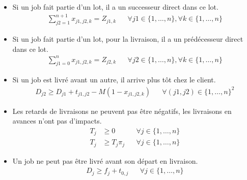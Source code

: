 \begin{itemize}
	\item
	      Si un job fait partie d’un lot, il a un successeur direct dans ce lot.
	      \begin{align}
		      \sum_{j2=1}^{n+1} x_{j1,j2,k} = Z_{j1,k} &  &
		      \forall j1 \in\{ 1, \ldots, n\}, \forall k \in\{1, \ldots, n\}
	      \end{align}
	\item
	      Si un job fait partie d’un lot, pour la livraison, il a un prédécesseur direct dans ce lot.
	      \begin{align}
		      \sum_{j1=0}^{n} x_{j1,j2,k} = Z_{j2,k} &  &
		      \forall j2 \in\{ 1, \ldots, n\}, \forall k \in\{1, \ldots, n\}
	      \end{align}
	\item
	      Si un job est livré avant un autre, il arrive plus tôt chez le client.
	      \begin{align}
		      D_{j2}\geq D_{j1} + t_{j1,j2} - M \left(1-x_{j1,j2,k} \right)
			& &
			\forall (j1, j2) \in \{ 1, \ldots, n \}^2
	      \end{align}
	\item
	      Les retards de livraisons ne peuvent pas être négatifs,
	      les livraisons en avances n’ont pas d’impacts.
	      \begin{align}
		      T_j & \geq 0         &  & \forall j \in\{1, \ldots, n\} \\
		      T_j & \geq T_j \pi_j &  & \forall j \in\{1, \ldots, n\}
	      \end{align}
	\item
	      Un job ne peut pas être livré avant son départ en livraison.
	      \begin{align}
		      D_j \geq f_j + t_{0, j} &  & \forall j \in\{1, \ldots, n\}
	      \end{align}
\end{itemize}
